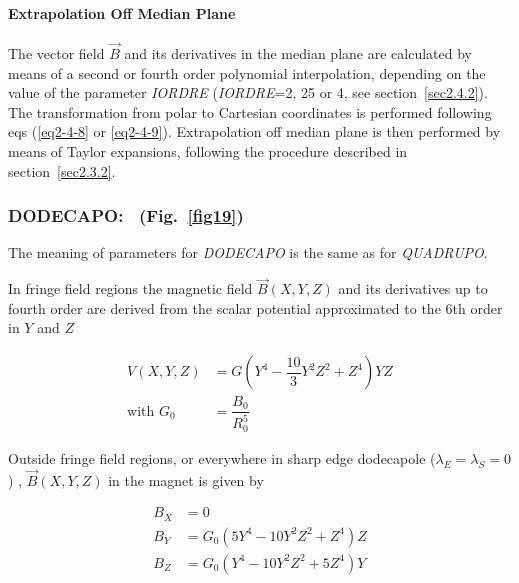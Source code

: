 \bigskip

\paragraph{Extrapolation Off Median Plane} 

\noindent The vector field $ \vec  B $ and its derivatives in the median plane
are calculated by means of a second or fourth order polynomial 
interpolation, depending 
on the value of the parameter \textsl{IORDRE} (\textsl{IORDRE}=2, 25 or 4, see 
section~\ref{sec2.4.2}). 
The transformation from polar to Cartesian coordinates is 
performed following eqs (\ref{eq2-4-8} or \ref{eq2-4-9}). Extrapolation off median plane is then 
performed by means of Taylor expansions, following the procedure described 
in section~\ref{sec2.3.2}. 









\newpage

\subsubsection*{DODECAPO: \DODECAPOTitl\  (Fig.\protect~\ref{fig19})} \label{DODECAPO}  
\medskip


 The meaning of parameters for \textsl{DODECAPO}  is the same as for \textsl{QUADRUPO}. 

\noindent In fringe field regions the magnetic field $ \vec  B(X,Y,Z) $ and
its derivatives up to fourth order are derived from the scalar potential approximated to 
the 6th order in $ Y $ and $ Z $ 

\begin{align*}
	V(X,Y,Z) &   = G \left(Y^4- \dfrac{10 }{ 3} Y^2Z^2+Z^4 \right) YZ  \\
	\text{with } G_0 &   =  \dfrac{ B_0 }{ R^5_0} 
\end{align*}

\noindent Outside fringe field regions, or everywhere in sharp edge dodecapole
($ \lambda_ E=\lambda_ S=0$) , $ \vec  B(X,Y,Z) $ in the magnet is given by 

\begin{align*}
	B_X &   =   0 \\
	B_Y &   =    G_0(5Y^4-10Y^2Z^2+Z^4)Z \\
	B_Z &   = G_0(Y^4-10Y^2Z^2+5Z^4)Y  
\end{align*}
\vfill


